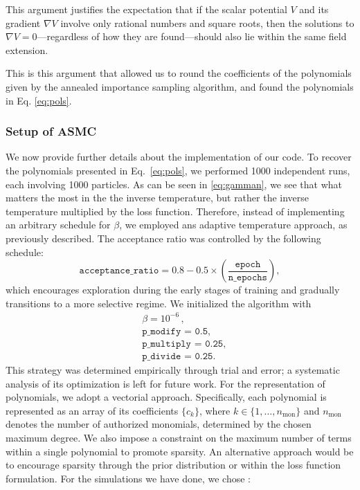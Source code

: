 \documentclass[11pt]{article}
\begin{document}
  This argument justifies the expectation that if the scalar potential $V$ and its gradient $\nabla V$ involve only rational numbers and square roots, then the solutions to $\nabla V = 0$—regardless of how they are found—should also lie within the same field extension.
  
 This is this argument that allowed us to round the coefficients of the polynomials given by the annealed importance sampling algorithm, and found the polynomials in Eq. \eqref{eq:pols}.
 
 \subsubsection{Setup of ASMC}

We now provide further details about the implementation of our code. To recover the polynomials presented in Eq.~\eqref{eq:pols}, we performed 1000 independent runs, each involving 1000 particles. As can be seen in \eqref{eq:gamman}, we see that what matters the most in the the inverse temperature, but rather the inverse temperature multiplied by the loss function. Therefore, instead of implementing an arbitrary schedule for $\beta$, we employed ans adaptive temperature approach, as previously described. The acceptance ratio was controlled by the following schedule:
\begin{equation}
	\texttt{acceptance\_ratio} = 0.8 - 0.5 \times \left(\frac{\texttt{epoch}}{\texttt{n\_epochs}}\right),
\end{equation}
which encourages exploration during the early stages of training and gradually transitions to a more selective regime. We initialized the algorithm with 
\begin{equation}\label{eq:sample10000adaptativetemp}
	\begin{aligned}
		&\beta = 10^{-6}\,, \\
		&\texttt{p\_{modify} = 0.5},\\
		&\texttt{p\_{multiply} = 0.25},\\
		&\texttt{p\_{divide} = 0.25}. 
	\end{aligned}
\end{equation}
This strategy was determined empirically through trial and error; a systematic analysis of its optimization is left for future work. For the representation of polynomials, we adopt a vectorial approach. Specifically, each polynomial is represented as an array of its coefficients $\{c_k\}$, where $k \in \{1,\dots,n_{\text{mon}}\}$ and $n_{\text{mon}}$ denotes the number of authorized monomials, determined by the chosen maximum degree. We also impose a constraint on the maximum number of terms within a single polynomial to promote sparsity. An alternative approach would be to encourage sparsity through the prior distribution or within the loss function formulation. For the simulations we have done, we chose : 
\end{document}
